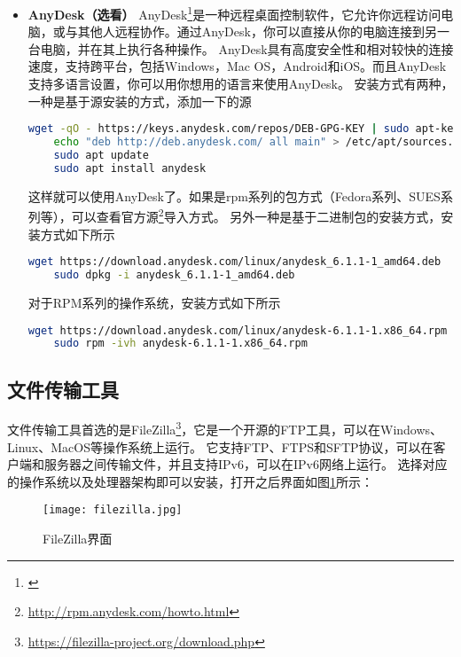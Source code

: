 \documentclass[lang=cn,a4paper,newtx]{elegantpaper}
\begin{document}
\begin{itemize}
  对于Fedora系列的操作系统安装步骤如下所示
  \begin{lstlisting}[language=bash]
    wget https://github.com/rustdesk/rustdesk/releases/download/1.2.3/rustdesk-1.2.3-0.x86_64.rpm
    sudo rpm -ivh rustdesk-1.2.3-0.x86_64.rpm
  \end{lstlisting}
  服务器端安装成功之后，可以设置自己的密码，在客户端安装对应的RustDesk，然后就可以远程操控电脑了。
  \item \textbf{AnyDesk（选看）}
  AnyDesk\footnote{\url{}}是一种远程桌面控制软件，它允许你远程访问电脑，或与其他人远程协作。通过AnyDesk，你可以直接从你的电脑连接到另一台电脑，并在其上执行各种操作。
  AnyDesk具有高度安全性和相对较快的连接速度，支持跨平台，包括Windows，Mac OS，Android和iOS。而且AnyDesk支持多语言设置，你可以用你想用的语言来使用AnyDesk。
  安装方式有两种，一种是基于源安装的方式，添加一下的源
  \begin{lstlisting}[language=bash]
    wget -qO - https://keys.anydesk.com/repos/DEB-GPG-KEY | sudo apt-key add -
    echo "deb http://deb.anydesk.com/ all main" > /etc/apt/sources.list.d/anydesk-stable.list
    sudo apt update
    sudo apt install anydesk
  \end{lstlisting}
  这样就可以使用AnyDesk了。如果是rpm系列的包方式（Fedora系列、SUES系列等），可以查看官方源\footnote{\url{http://rpm.anydesk.com/howto.html}}导入方式。
  另外一种是基于二进制包的安装方式，安装方式如下所示
  \begin{lstlisting}[language=bash]
    wget https://download.anydesk.com/linux/anydesk_6.1.1-1_amd64.deb
    sudo dpkg -i anydesk_6.1.1-1_amd64.deb
  \end{lstlisting}
  对于RPM系列的操作系统，安装方式如下所示
  \begin{lstlisting}[language=bash]
    wget https://download.anydesk.com/linux/anydesk-6.1.1-1.x86_64.rpm
    sudo rpm -ivh anydesk-6.1.1-1.x86_64.rpm
  \end{lstlisting}
  \end{itemize}
\subsection{文件传输工具}
文件传输工具首选的是FileZilla\footnote{\url{https://filezilla-project.org/download.php}}，它是一个开源的FTP工具，可以在Windows、Linux、MacOS等操作系统上运行。
它支持FTP、FTPS和SFTP协议，可以在客户端和服务器之间传输文件，并且支持IPv6，可以在IPv6网络上运行。
选择对应的操作系统以及处理器架构即可以安装，打开之后界面如图\ref{fig:filezilla}所示：

\begin{figure}[hbpt]
  \centering
  \texttt{[image: filezilla.jpg]}
  \caption{FileZilla界面}
  \label{fig:filezilla}
\end{figure}
\end{document}
